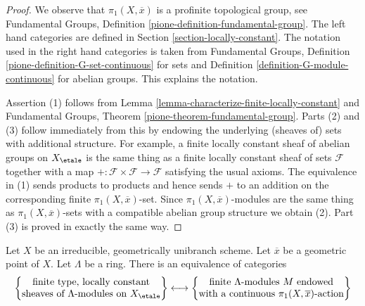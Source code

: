 \begin{proof}
We observe that $\pi_1(X, \overline{x})$ is a profinite
topological group, see Fundamental Groups, Definition
\ref{pione-definition-fundamental-group}.
The left hand categories are defined in
Section \ref{section-locally-constant}.
The notation used in the right hand categories is taken from
Fundamental Groups, Definition \ref{pione-definition-G-set-continuous}
for sets and
Definition \ref{definition-G-module-continuous} for abelian groups.
This explains the notation.

\medskip\noindent
Assertion (1) follows from
Lemma \ref{lemma-characterize-finite-locally-constant}
and Fundamental Groups, Theorem \ref{pione-theorem-fundamental-group}.
Parts (2) and (3) follow immediately from this by endowing the underlying
(sheaves of) sets with additional structure. For example, a finite
locally constant sheaf of abelian groups on $X_\etale$ is the same thing
as a finite locally constant sheaf of sets $\mathcal{F}$
together with a map $+ : \mathcal{F} \times \mathcal{F} \to \mathcal{F}$
satisfying the usual axioms. The equivalence in (1) sends products
to products and hence sends $+$ to an addition on the corresponding
finite $\pi_1(X, \overline{x})$-set. Since $\pi_1(X, \overline{x})$-modules
are the same thing as $\pi_1(X, \overline{x})$-sets with a compatible
abelian group structure we obtain (2). Part (3) is proved in
exactly the same way.
\end{proof}

\begin{lemma}
\label{lemma-locally-constant-on-connected-geom-unibranch}
Let $X$ be an irreducible, geometrically unibranch scheme.
Let $\overline{x}$ be a geometric point of $X$.
Let $\Lambda$ be a ring. There is an equivalence of categories
$$
\left\{
\begin{matrix}
\text{finite type, locally constant}\\
\text{sheaves of }\Lambda\text{-modules on }X_\etale
\end{matrix}
\right\}
\longleftrightarrow
\left\{
\begin{matrix}
\text{finite }\Lambda\text{-modules }M\text{ endowed}\\
\text{with a continuous }\pi_1(X, \overline{x})\text{-action}
\end{matrix}
\right\}
$$
\end{lemma}

